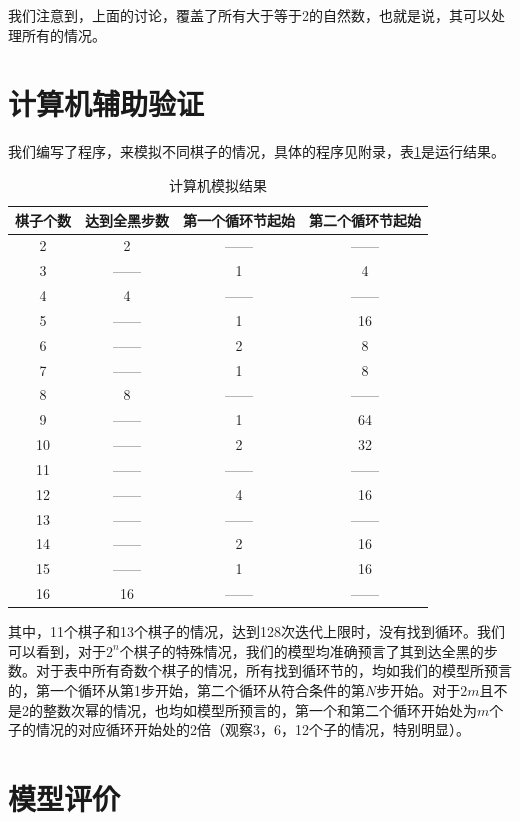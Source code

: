 \documentclass[12pt,AutoFakeSlant,AutoFakeBold]{article}
\begin{document}
我们注意到，上面的讨论，覆盖了所有大于等于2的自然数，也就是说，其可以处理所有的情况。

\section{计算机辅助验证}

我们编写了程序，来模拟不同棋子的情况，具体的程序见附录，表\ref{tab:模拟结果}是运行结果。

\begin{table}[!ht]
    \centering
    \caption{计算机模拟结果}
    \begin{tabular}{cccc}
        \toprule
        棋子个数 & 达到全黑步数 & 第一个循环节起始 & 第二个循环节起始 \\ 
        \midrule
        2 & 2 & —— & —— \\ 
        3 & —— & 1 & 4 \\ 
        4 & 4 & —— & —— \\ 
        5 & —— & 1 & 16 \\ 
        6 & —— & 2 & 8 \\ 
        7 & —— & 1 & 8 \\ 
        8 & 8 & —— & —— \\ 
        9 & —— & 1 & 64 \\ 
        10 & —— & 2 & 32 \\ 
        11 & —— & —— & —— \\ 
        12 & —— & 4 & 16 \\ 
        13 & —— & —— & —— \\ 
        14 & —— & 2 & 16 \\ 
        15 & —— & 1 & 16 \\ 
        16 & 16 & —— & —— \\ 
        \bottomrule
    \end{tabular}
    \label{tab:模拟结果}
\end{table}

其中，11个棋子和13个棋子的情况，达到128次迭代上限时，没有找到循环。我们可以看到，对于$2^n$个棋子的特殊情况，我们的模型均准确预言了其到达全黑的步数。对于表中所有奇数个棋子的情况，所有找到循环节的，均如我们的模型所预言的，第一个循环从第1步开始，第二个循环从符合条件的第$N$步开始。对于$2m$且不是2的整数次幂的情况，也均如模型所预言的，第一个和第二个循环开始处为$m$个子的情况的对应循环开始处的2倍（观察3，6，12个子的情况，特别明显）。

\section{模型评价}
\end{document}
